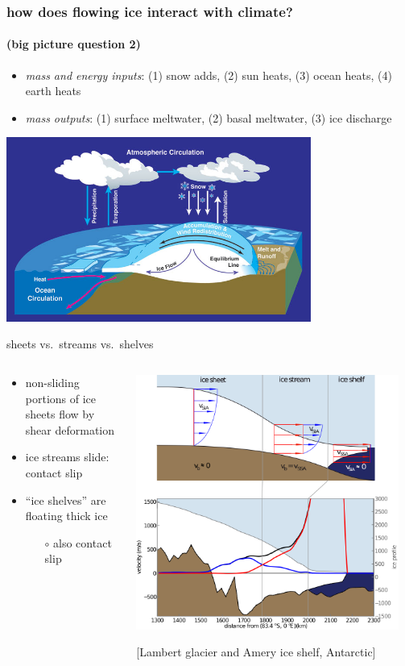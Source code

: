 \documentclass[hide notes,intlimits]{beamer}
\newcommand{\contactslipslide}{
\begin{frame}{sheets vs.~streams vs.~shelves}

\begin{columns}
\begin{column}{0.35\textwidth}
\small
\begin{itemize}
\small
\item non-sliding portions of ice sheets flow by shear deformation
\item ice streams slide: \alert{contact slip}
\item ``ice shelves'' are floating thick ice
  \begin{itemize}
  \scriptsize
  \item[$\circ$] also \alert{contact slip}
  \end{itemize}
\end{itemize}
\end{column}

\begin{column}{0.65\textwidth}

\hfill\includegraphics[width=0.95\textwidth]{siassacartoon-lambert}

\begin{center}
\vspace{-0.18in}
\tiny [Lambert glacier and Amery ice shelf, Antarctic]
\end{center}
\end{column}
\end{columns}
\end{frame}
}
\begin{document}
\begin{frame}
  \frametitle{how does flowing ice interact with climate?}
  \framesubtitle{(big picture question 2)}

\medskip
\small
\begin{itemize}
\item \emph{mass and energy inputs}: (1) snow adds, (2) sun heats, (3) ocean heats, (4) earth heats
\item \emph{mass outputs}: (1) surface meltwater, (2) basal meltwater, (3) ice discharge
\end{itemize}

\begin{center}
  \includegraphics[width=0.75\textwidth]{mass-bal-atmos}
\end{center}
\end{frame}


\contactslipslide
\end{document}

